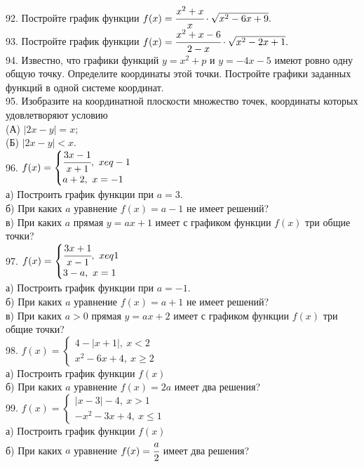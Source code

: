 92. Постройте график функции $f(x)=\cfrac{x^2+x}{x}\cdot\sqrt{x^2-6x+9}.$\\
93. Постройте график функции $f(x)=\cfrac{x^2+x-6}{2-x}\cdot\sqrt{x^2-2x+1}.$\\
94. Известно, что графики функций $y=x^2+p$ и $y=-4x-5$ имеют ровно одну общую точку. Определите координаты этой точки. Постройте графики заданных функций в одной системе координат.\\
95. Изобразите на координатной плоскости множество точек, координаты которых удовлетворяют условию\\
(А) $|2x-y|=x;$\\
(Б) $|2x-y|<x.$\\
96. $f(x)=\begin{cases} \cfrac{3x-1}{x+1},\ x
eq-1\\a+2,\ x=-1 \end{cases}$\\
а) Построить график функции при $a=3.$\\
б) При каких $a$ уравнение $f(x)=a-1$ не имеет решений?\\
в) При каких $a$ прямая $y=ax+1$ имеет с графиком функции $f(x)$ три общие точки?\\
97. $f(x)=\begin{cases} \cfrac{3x+1}{x-1},\ x
eq1\\3-a,\ x=1 \end{cases}$\\
а) Построить график функции при $a=-1.$\\
б) При каких $a$ уравнение $f(x)=a+1$ не имеет решений?\\
в) При каких $a>0$ прямая $y=ax+2$ имеет с графиком функции $f(x)$ три общие точки?\\
98. $f(x)=\begin{cases} 4-|x+1|,\ x<2\\ x^2-6x+4,\ x\geqslant 2\end{cases}$\\
а) Построить график функции $f(x)$\\
б) При каких $a$ уравнение $f(x)=2a$ имеет два решения?\\
99. $f(x)=\begin{cases} |x-3|-4,\ x>1\\ -x^2-3x+4,\ x\leqslant 1\end{cases}$\\
а) Построить график функции $f(x)$\\
б) При каких $a$ уравнение $f(x)=\cfrac{a}{2}$ имеет два решения?\\
